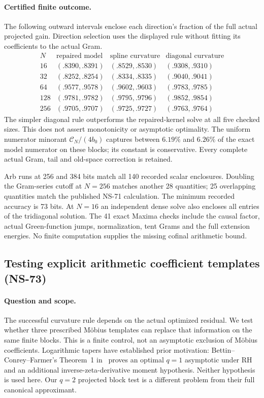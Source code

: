 \documentclass[11pt]{article}
\theoremstyle{remark}
\begin{document}
\paragraph{Certified finite outcome.}
The following outward intervals enclose each direction's fraction of the
full actual projected gain. Direction selection uses the displayed rule
without fitting its coefficients to the actual Gram.
\[
\begin{array}{c|ccc}
 N&\text{repaired model}&\text{spline curvature}&\text{diagonal curvature}\\ \hline
16&(.8390,.8391)&(.8529,.8530)&(.9308,.9310)\\
32&(.8252,.8254)&(.8334,.8335)&(.9040,.9041)\\
64&(.9577,.9578)&(.9602,.9603)&(.9783,.9785)\\
128&(.9781,.9782)&(.9795,.9796)&(.9852,.9854)\\
256&(.9705,.9707)&(.9725,.9727)&(.9763,.9764)
\end{array}
\]
The simpler diagonal rule outperforms the repaired-kernel solve at all
five checked sizes. This does not assert monotonicity or asymptotic
optimality. The uniform numerator minorant $\mathcal C_N/(4b_0)$ captures
between $6.19\%$ and $6.26\%$ of the exact model numerator on these blocks;
its constant is conservative. Every complete actual Gram, tail and
old-space correction is retained.

Arb runs at 256 and 384 bits match all 140 recorded scalar enclosures.
Doubling the Gram-series cutoff at $N=256$ matches another 28 quantities;
25 overlapping quantities match the published NS-71 calculation.
The minimum recorded accuracy is 73 bits. At $N=16$ an independent
dense solve also encloses all entries of the tridiagonal solution.
The 41 exact Maxima checks include the causal factor, actual Green-function
jumps, normalization, tent Grams and the full extension energies.
No finite computation supplies the missing cofinal arithmetic bound.

\subsection{Testing explicit arithmetic coefficient templates (NS-73)}
\label{sec:ns73-mobius-templates}

\paragraph{Question and scope.}
The successful curvature rule depends on the actual optimized residual.
We test whether three prescribed M\"obius templates can replace that
information on the same finite blocks. This is a finite control, not an
asymptotic exclusion of M\"obius coefficients. Logarithmic tapers have
established prior motivation: Bettin--Conrey--Farmer's Theorem~1
in~\cite{BettinConreyFarmer2013} proves an optimal $q=1$ asymptotic under
RH and an additional inverse-zeta-derivative moment hypothesis. Neither
hypothesis is used here. Our $q=2$ projected block test is a different
problem from their full canonical approximant.
\end{document}
